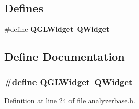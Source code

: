 \subsection*{Defines}
\begin{CompactItemize}
\item 
\#define {\bf QGLWidget}\ {\bf QWidget}
\end{CompactItemize}


\subsection{Define Documentation}
\subsubsection{\setlength{\rightskip}{0pt plus 5cm}\#define {\bf QGLWidget}\ {\bf QWidget}}\label{analyzerbase_8h_a0}




Definition at line 24 of file analyzerbase.h.